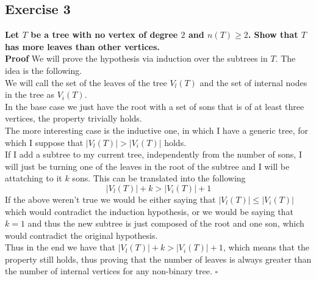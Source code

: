 \subsection*{Exercise 3}
\boldmath 
\textbf{Let $T$ be a tree with no vertex of degree $2$ and $n(T) \geq 2$. Show that $T$ has more leaves than
other vertices.}
\unboldmath 
\\ 
\linebreak 
\textbf{Proof}
We will prove the hypothesis via induction over the subtrees in $T$. The idea is the following.\\ 
\linebreak 
We will call the set of the leaves of the tree $V_l(T)$ and the set of internal nodes in the tree as
$V_i(T)$.\\ 
\linebreak 
In the base case we just have the root with a set of sons that is of at least three vertices, the
property trivially holds.\\
\linebreak
The more interesting case is the inductive one, in which I have a generic tree, for
which I suppose that $|V_l(T)| > |V_i(T)|$ holds.\\
If I add a subtree to my current tree, independently from the number of sons, I will just be turning one of
the leaves in the root of the subtree and I will be attatching to it $k$ sons. This can be
translated into the following
\begin{equation}
    |V_l(T)| + k > |V_i(T)| + 1
\end{equation}
If the above weren't true we would be either saying that $|V_l(T)| \leq |V_i(T)|$ which would
contradict the induction hypothesis, or we would be saying that $k = 1$ and thus the new subtree is
just composed of the root and one son, which would contradict the original hypothesis.\\
\linebreak 
Thus in the end we have that $|V_l(T)| + k > |V_i(T)| + 1$, which means that the property still holds, thus
proving that the number of leaves is always greater than the number of internal vertices for
any non-binary tree. \hspace{10mm} $\square$
